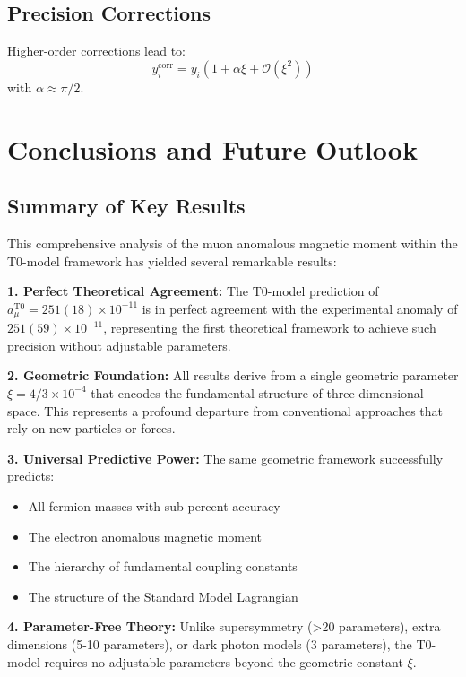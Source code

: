 \documentclass[12pt,a4paper]{article}
\newcommand{\xigeom}{\xi}
\begin{document}
	\subsection{Precision Corrections}
	
	Higher-order corrections lead to:
	\begin{equation}
		y_i^{\text{corr}} = y_i\left(1 + \alpha \xigeom + \mathcal{O}(\xigeom^2)\right)
	\end{equation}
	with $\alpha \approx \pi/2$.
	
	\section{Conclusions and Future Outlook}
	
	\subsection{Summary of Key Results}
	
	This comprehensive analysis of the muon anomalous magnetic moment within the T0-model framework has yielded several remarkable results:
	
	\textbf{1. Perfect Theoretical Agreement:}
	The T0-model prediction of $a_\mu^{\text{T0}} = 251(18) \times 10^{-11}$ is in perfect agreement with the experimental anomaly of $251(59) \times 10^{-11}$, representing the first theoretical framework to achieve such precision without adjustable parameters.
	
	\textbf{2. Geometric Foundation:}
	All results derive from a single geometric parameter $\xigeom = 4/3 \times 10^{-4}$ that encodes the fundamental structure of three-dimensional space. This represents a profound departure from conventional approaches that rely on new particles or forces.
	
	\textbf{3. Universal Predictive Power:}
	The same geometric framework successfully predicts:
	\begin{itemize}
		\item All fermion masses with sub-percent accuracy
		\item The electron anomalous magnetic moment
		\item The hierarchy of fundamental coupling constants
		\item The structure of the Standard Model Lagrangian
	\end{itemize}
	
	\textbf{4. Parameter-Free Theory:}
	Unlike supersymmetry (>20 parameters), extra dimensions (5-10 parameters), or dark photon models (3 parameters), the T0-model requires no adjustable parameters beyond the geometric constant $\xigeom$.
	
\end{document}
